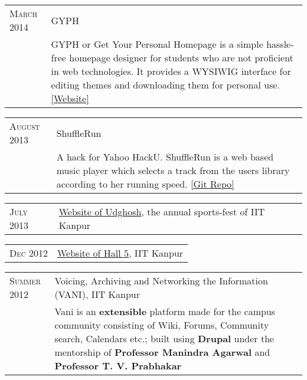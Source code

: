 \documentclass[a4paper,10pt]{article} %
\begin{document}
\begin{tabular}{>{\raggedleft}p{2.2cm}|p{14cm}}
    \textsc{March 2014} & GYPH\\
                        & \footnotesize{GYPH or Get Your Personal Homepage
                           is a simple hassle-free homepage designer for students who are not
                           proficient in web technologies. It provides a WYSIWIG
                           interface for editing themes and downloading them for personal use.
                           \href{http://gyph2.herokuapp.com/} {[Website]} } \\
\end{tabular}

\begin{tabular}{>{\raggedleft}p{2.2cm}|p{14cm}}
    \textsc{August 2013} & ShuffleRun\\
                         & \footnotesize{A hack for Yahoo HackU. ShuffleRun is a
                            web based music player which selects a track from the users library according to her running speed.
                            \href{https://github.com/srijanshetty/ShuffleRun} {[Git Repo]}}\\
\end{tabular}

\begin{tabular}{>{\raggedleft}p{2.2cm}|p{14cm}}
    \textsc{July 2013} & \href{www.udghosh.org}{Website of Udghosh}, the annual sports-fest of IIT Kanpur\\
\end{tabular}

\begin{tabular}{>{\raggedleft}p{2.2cm}|p{14cm}}
    \textsc{Dec 2012} & \href{http://www.iitk.ac.in/hall5}{Website of Hall 5}, IIT Kanpur \\
\end{tabular}

\begin{tabular}{>{\raggedleft}p{2.2cm}|p{14cm}}
    \textsc{Summer 2012} & Voicing, Archiving and Networking the Information \textsc{(VANI)}, IIT Kanpur\\
                           & \footnotesize{Vani is an \textbf{extensible} platform
                              made for the campus community consisting of Wiki, Forums,
                              Community search, Calendars etc.; built using \textbf{Drupal}
                              under the mentorship of \textbf{Professor Manindra Agarwal} and
                              \textbf{Professor T. V. Prabhakar} } \\
\end{tabular}
\end{document}
